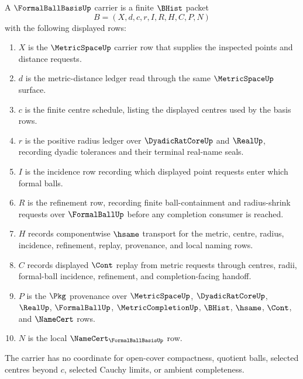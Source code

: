 \begin{definition}
\label{def:formal-ball-basis-carrier}
A $\FormalBallBasisUp$ carrier is a finite $\BHist$ packet
$$
B=(X,d,c,r,I,R,H,C,P,N)
$$
with the following displayed rows:
\begin{enumerate}
\item $X$ is the $\MetricSpaceUp$ carrier row that supplies the inspected points and distance requests.
\item $d$ is the metric-distance ledger read through the same $\MetricSpaceUp$ surface.
\item $c$ is the finite centre schedule, listing the displayed centres used by the basis rows.
\item $r$ is the positive radius ledger over $\DyadicRatCoreUp$ and $\RealUp$, recording dyadic tolerances and their terminal real-name seals.
\item $I$ is the incidence row recording which displayed point requests enter which formal balls.
\item $R$ is the refinement row, recording finite ball-containment and radius-shrink requests over $\FormalBallUp$ before any completion consumer is reached.
\item $H$ records componentwise $\hsame$ transport for the metric, centre, radius, incidence, refinement, replay, provenance, and local naming rows.
\item $C$ records displayed $\Cont$ replay from metric requests through centres, radii, formal-ball incidence, refinement, and completion-facing handoff.
\item $P$ is the $\Pkg$ provenance over $\MetricSpaceUp$, $\DyadicRatCoreUp$, $\RealUp$, $\FormalBallUp$, $\MetricCompletionUp$, $\BHist$, $\hsame$, $\Cont$, and $\NameCert$ rows.
\item $N$ is the local $\NameCert_{\FormalBallBasisUp}$ row.
\end{enumerate}
The carrier has no coordinate for open-cover compactness, quotient balls, selected centres beyond $c$, selected Cauchy limits, or ambient completeness.
\end{definition}

